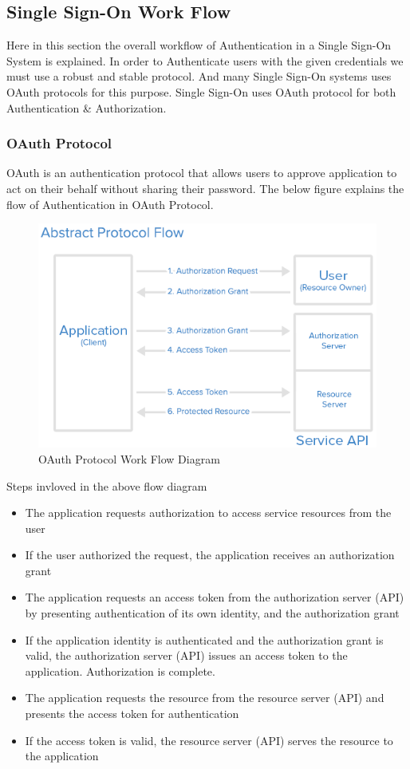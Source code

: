 \documentclass[12pt]{report}
\begin{document}
\subsection{Single Sign-On Work Flow}
Here in this section the overall workflow of Authentication in a Single Sign-On System is explained. In order to Authenticate users with the given credentials we must use a robust and stable protocol. And many Single Sign-On systems uses OAuth protocols for this purpose. Single Sign-On uses OAuth protocol for both Authentication \& Authorization.
\subsubsection{OAuth Protocol}
OAuth is an authentication protocol that allows users to approve application to act on their behalf without sharing their password.
The below figure explains the flow of Authentication in OAuth Protocol.
\begin{figure}[H]
\begin{center}
\includegraphics[scale=0.5]{abstract_flow}
\caption{OAuth Protocol Work Flow Diagram\label{fig:OAuth Protocol Work Flow Diagram}}
\end{center}
\end{figure}
Steps invloved in the above flow diagram
\begin{itemize}
\item The application requests authorization to access service resources from the user
\item If the user authorized the request, the application receives an authorization grant
\item The application requests an access token from the authorization server (API) by presenting authentication of its own identity, and the authorization grant
\item If the application identity is authenticated and the authorization grant is valid, the authorization server (API) issues an access token to the application. Authorization is complete.
\item The application requests the resource from the resource server (API) and presents the access token for authentication
\item If the access token is valid, the resource server (API) serves the resource to the application

\end{itemize}
\newpage
\end{document}
